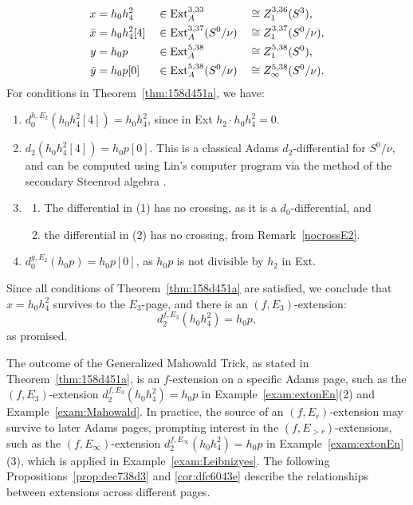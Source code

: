 \documentclass{amsart}
\numberwithin{equation}{section}
\begin{document}
\begin{example}
\begin{align*}
x & =h_0h_4^2 && \in \mathrm{Ext}_A^{3,33} && \cong Z_1^{3,36}(S^3),\\
\bar{x} & =h_0h_4^2[4] && \in \mathrm{Ext}_A^{3,37}(S^0/\nu) && \cong Z_1^{3,37}(S^0/\nu), \\
y & =h_0p && \in \mathrm{Ext}_A^{5,38} && \cong Z_1^{5,38}(S^0),\\
        \bar{y} & =h_0p[0] && \in \mathrm{Ext}_A^{5,38}(S^0/\nu) && \cong Z_\infty^{5,38}(S^0/\nu). 
  \end{align*}      
For conditions in Theorem~\ref{thm:158d451a}, we have:
\begin{enumerate}
      \item $d_0^{h, E_2}(h_0h_4^2[4]) = h_0h_4^2$, since in Ext $h_2 \cdot h_0h_4^2 = 0$.
      \item $d_2(h_0h_4^2[4]) = h_0p[0]$. This is a classical Adams $d_2$-differential for $S^0/\nu$, and can be computed using Lin's computer program via the method of the secondary Steenrod algebra \cite{BJ, Nassau, Chua}.
      \item 
      \begin{enumerate}
          \item The differential in (1) has no crossing, as it is a $d_0$-differential, and
          \item the differential in (2) has no crossing, from Remark~\ref{nocrossE2}. 
      \end{enumerate}
      \item 
      $d_0^{g, E_2} (h_0p) = h_0p[0]$, as $h_0p$ is not divisible by $h_2$ in Ext.
      \end{enumerate}
    Since all conditions of  Theorem~\ref{thm:158d451a} are  satisfied, we conclude that $x=h_0h_4^2$ survives to the $E_3$-page, and there is an $(f, E_3)$-extension:
        $$d_2^{f, E_3} (h_0h_4^2) = h_0 p,$$
        as promised.
        
\end{example}

The outcome of the Generalized Mahowald Trick, as stated in Theorem~\ref{thm:158d451a}, is an $f$-extension on a specific Adams page, such as the $(f, E_3)$-extension $d_2^{f, E_3} (h_0h_4^2) = h_0 p$ in Example~\ref{exam:extonEn}(2) and Example~\ref{exam:Mahowald}. In practice, the source of an $(f, E_r)$-extension may survive to later Adams pages, prompting interest in the $(f, E_{>r})$-extensions, such as the $(f, E_\infty)$-extension $d_2^{f, E_\infty} (h_0h_4^2) = h_0 p$ in Example~\ref{exam:extonEn}(3), which is applied in Example~\ref{exam:Leibnizyes}. The following Propositions~\ref{prop:dec738d3} and \ref{cor:dfc6043e} describe the relationships between extensions across different pages.
\end{document}

